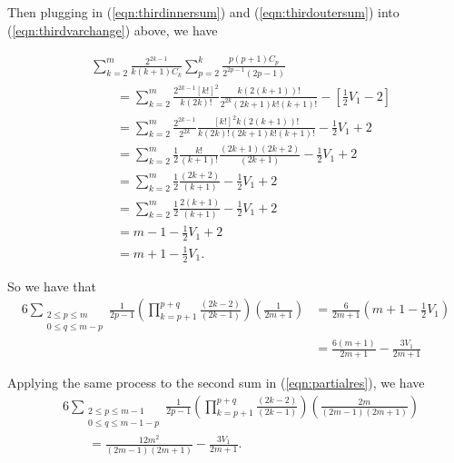 \documentclass[11pt]{article}
\theoremstyle{definition}
\theoremstyle{definition}
\theoremstyle{plain}
\theoremstyle{plain}
\theoremstyle{plain}
\theoremstyle{definition}
\theoremstyle{definition}
\begin{document}
{Then plugging in (\ref{eqn:thirdinnersum}) and (\ref{eqn:thirdoutersum}) into (\ref{eqn:thirdvarchange}) above, we have

\begin{equation}
\begin{aligned}
&\sum\limits_{k=2}^m\frac{2^{2k-1}}{k(k+1)C_k}\sum\limits_{p=2}^k\frac{p(p+1)C_p}{2^{2p-1}(2p-1)} \\
&\qquad = \sum\limits_{k=2}^m\frac{2^{2k-1}[k!]^2}{k(2k)!}\frac{k(2(k+1))!}{2^{2k}(2k+1)k!(k+1)!} - \left[\frac{1}{2}V_1-2\right] \\
&\qquad = \sum\limits_{k=2}^m\frac{2^{2k-1}}{2^{2k}}\frac{[k!]^2k(2(k+1))!}{k(2k)!(2k+1)k!(k+1)!} - \frac{1}{2}V_1 + 2 \\
&\qquad = \sum\limits_{k=2}^m \frac{1}{2}\frac{k!}{(k+1)!}\frac{(2k+1)(2k+2)}{(2k+1)} -\frac{1}{2}V_1 + 2 \\
&\qquad = \sum\limits_{k=2}^m \frac{1}{2}\frac{(2k+2)}{(k+1)} - \frac{1}{2}V_1 + 2 \\
&\qquad = \sum\limits_{k=2}^m \frac{1}{2}\frac{2(k+1)}{(k+1)}  - \frac{1}{2}V_1 + 2 \\
&\qquad = m - 1 - \frac{1}{2}V_1 + 2 \\
&\qquad = m + 1 - \frac{1}{2}V_1.
\end{aligned}
\end{equation}

So we have that 
\begin{equation}\label{eqn:thirdsimp}
\begin{aligned}
6\sum\limits_{\substack{2 \leq p \leq m \\ 0 \leq q \leq m - p}} \frac{1}{2p-1}\left(\prod\limits_{k=p+1}^{p+q}\frac{(2k-2)}{(2k-1)}\right)\left(\frac{1}{2m+1}\right) &= \frac{6}{2m+1}\left(m + 1 - \frac{1}{2}V_1\right) \\
&= \frac{6(m+1)}{2m+1} - \frac{3V_1}{2m+1}
\end{aligned}
\end{equation}

Applying the same process to the second sum in (\ref{eqn:partialres}), we have
\begin{equation}\label{eqn:secondsimp}
\begin{aligned}
&6\sum\limits_{\substack{2\leq p \leq m -1 \\ 0 \leq q \leq m - 1 - p}}\frac{1}{2p-1}\left(\prod\limits_{k=p+1}^{p+q}\frac{(2k-2)}{(2k-1)}\right)\left(\frac{2m}{(2m-1)(2m+1)}\right) \\
&\qquad = \frac{12m^2}{(2m-1)(2m+1)} - \frac{3V_1}{2m+1}.
\end{aligned}
\end{equation}

}
\end{document}
